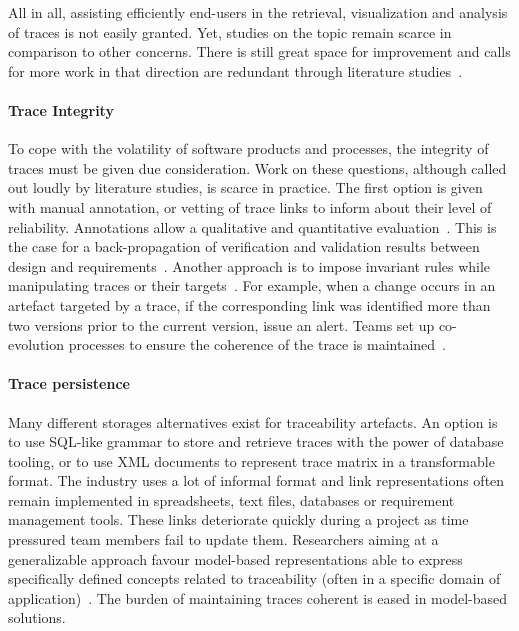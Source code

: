 All in all, assisting efficiently end-users in the retrieval, visualization and analysis of traces is not easily granted. Yet, studies on the topic remain scarce in comparison to other concerns. There is still great space for improvement and calls for more work in that direction are redundant through literature studies~\cite{Gotel2012,antoniol2017-traceability-grand-challenges}.

\paragraph{Trace Integrity} 
To cope with the volatility of software products and processes, the integrity of traces must be given due consideration. Work on these questions, although called out loudly by literature studies, is scarce in practice. The first option is given with manual annotation, or vetting of trace links to inform about their level of reliability. Annotations allow a qualitative and quantitative evaluation~\cite{Buchmann_2015}. This is the case for a back-propagation of verification and validation results between design and requirements~\cite{Hegedus_2010}.  
Another approach is to impose invariant rules while manipulating traces or their targets~\cite{Bunder_2017_query-for-quality}. For example, when a change occurs in an artefact targeted by a trace, if the corresponding link was identified more than two versions prior to the current version, issue an alert. 
Teams set up co-evolution processes to ensure the coherence of the trace is maintained~\cite{rahimi2019-Evolving-trace-req2source}. 


\paragraph{Trace persistence} 
Many different storages alternatives exist for traceability artefacts.
An option is to use SQL-like grammar to store and retrieve traces with the power of database tooling, or to use XML documents to represent trace matrix in a transformable format. The industry uses a lot of informal format and link representations often remain implemented in spreadsheets, text files, databases or requirement management tools. These links deteriorate quickly during a project as time pressured team members fail to update them. Researchers aiming at a generalizable approach favour model-based representations able to express specifically defined concepts related to traceability (often in a specific domain of application)~\cite{clelandhuang2007bestPracticeForAutomatedTraceability}. The burden of maintaining traces coherent is eased in model-based solutions.

